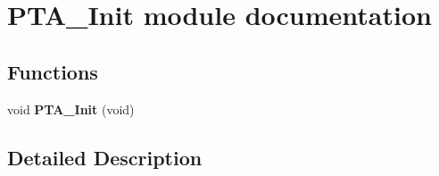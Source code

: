 \hypertarget{group___p_t_a___init__module}{}\section{P\+T\+A\+\_\+\+Init module documentation}
\label{group___p_t_a___init__module}
\subsection*{Functions}
\begin{DoxyCompactItemize}
\item 
void {\bfseries P\+T\+A\+\_\+\+Init} (void)\hypertarget{group___p_t_a___init__module_gacb83c9aaf575b61c1eab15d892e6b8a0}{}\label{group___p_t_a___init__module_gacb83c9aaf575b61c1eab15d892e6b8a0}

\end{DoxyCompactItemize}


\subsection{Detailed Description}
